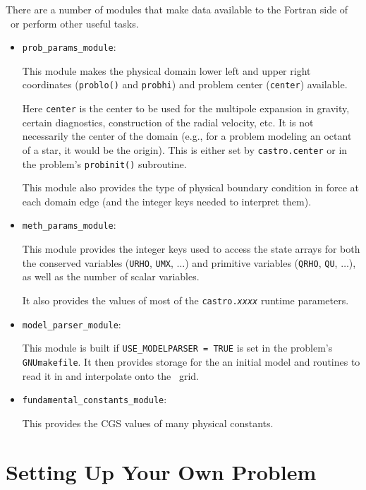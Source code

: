 There are a number of modules that make data available to the Fortran
side of \castro\ or perform other useful tasks.

\begin{itemize}
\item {\tt prob\_params\_module}:

  This module makes the physical domain lower left and upper right
  coordinates ({\tt problo()} and {\tt probhi}) and problem center
  ({\tt center}) available.

  Here {\tt center} is the center to
  be used for the multipole expansion in gravity, certain diagnostics,
  construction of the radial velocity, etc.  It is not necessarily
  the center of the domain (e.g., for a problem modeling an octant
  of a star, it would be the origin).  This is either set by
  {\tt castro.center} or in the problem's {\tt probinit()}
  subroutine.

  This module also provides the type of physical boundary
  condition in force at each domain edge (and the integer
  keys needed to interpret them).

\item {\tt meth\_params\_module}:

  This module provides the integer keys used to access the state
  arrays for both the conserved variables ({\tt URHO}, {\tt UMX}, $\ldots$)
  and primitive variables ({\tt QRHO}, {\tt QU}, $\ldots$), as well
  as the number of scalar variables.

  It also provides the values of most of the {\tt castro.{\em xxxx}}
  runtime parameters.

\item {\tt model\_parser\_module}:

  This module is built if {\tt USE\_MODELPARSER = TRUE} is set in the
  problem's {\tt GNUmakefile}.  It then provides storage for the an
  initial model and routines to read it in and interpolate onto the
  \castro\ grid.

\item {\tt fundamental\_constants\_module}:

  This provides the CGS values of many physical constants.

\end{itemize}



\section{Setting Up Your Own Problem}


